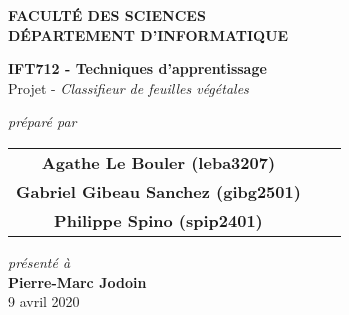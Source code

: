 \documentclass[letterpaper, 12pt]{article}
\begin{document}
    \begin{titlepage}
        \begin{center}
            \begin{large}
                \textbf{FACULTÉ DES SCIENCES} \\
                \textbf{DÉPARTEMENT D'INFORMATIQUE}
            \end{large}
            \vfill
            \begin{Large}
                \textbf{IFT712 - Techniques d'apprentissage} \\
                Projet - \textit{Classifieur de feuilles végétales}
            \end{Large}
            \vfill
            \textit{préparé par} \\
            \begin{tabular}{ccc}
                \textbf{Agathe Le Bouler (leba3207)} \\
                \textbf{Gabriel Gibeau Sanchez (gibg2501)} \\
                \textbf{Philippe Spino (spip2401)}
            \end{tabular}
            \vfill
            \textit{présenté à} \\
            \textbf{Pierre-Marc Jodoin} \\
            \vfill
            9 avril 2020
        \end{center}
    \end{titlepage}
    \pagebreak
    
    
    \tableofcontents
    \pagebreak
    
    \renewcommand{\figurename}{Figure}
    \renewcommand{\cftfigpresnum}{Figure }
    \renewcommand{\cftfignumwidth}{2cm}
    \listoffigures
    \pagebreak
%    
    \renewcommand{\tablename}{Tableau}
    \renewcommand{\cfttabpresnum}{Tableau }
    \renewcommand{\cfttabnumwidth}{2cm}
    \listoftables
    \pagebreak
    
    
    
    
    
    
    
    
    
    \pagebreak
        
    \pagebreak
    
    \singlespacing
    \renewcommand{\refname}{Bibliographie}
    
    
\end{document}
